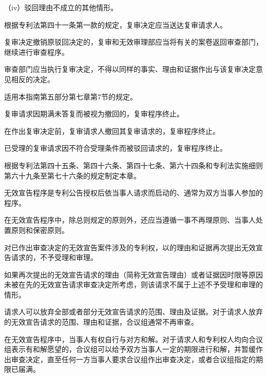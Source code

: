 {\setlength{\parindent}{17.1bp}（iv）驳回理由不成立的其他情形。\par}

根据专利法第四十一条第一款的规定，复审决定应当送达复审请求人。

复审决定撤销原驳回决定的，复审和无效审理部应当将有关的案卷返回审查部门，继续进行审查程序。

审查部门应当执行复审决定，不得以同样的事实、理由和证据作出与该复审决定意见相反的决定。

适用本指南第五部分第七章第7节的规定。

复审请求因期满未答复而被视为撤回的，复审程序终止。

在作出复审决定前，复审请求人撤回其复审请求的，复审程序终止。

已受理的复审请求因不符合受理条件而被驳回请求的，复审程序终止。

根据专利法第四十五条、第四十六条、第四十七条、第六十四条和专利法实施细则第六十九条至第七十六条的规定制定本章。

无效宣告程序是专利公告授权后依当事人请求而启动的、通常为双方当事人参加的程序。

在无效宣告程序中，除总则规定的原则外，还应当遵循一事不再理原则、当事人处置原则和保密原则。

对已作出审查决定的无效宣告案件涉及的专利权，以的理由和证据再次提出无效宣告请求的，不予受理和审理。

如果再次提出的无效宣告请求的理由（简称无效宣告理由）或者证据因时限等原因未被在先的无效宣告请求审查决定所考虑，则该请求不属于上述不予受理和审理的情形。

请求人可以放弃全部或者部分无效宣告请求的范围、理由及证据。对于请求人放弃的无效宣告请求的范围、理由和证据，合议组通常不再审查。

在无效宣告程序中，当事人有权自行与对方和解。对于请求人和专利权人均向合议组表示有和解愿望的，合议组可以给予双方当事人一定的期限进行和解，并暂缓作出审查决定，直至任何一方当事人要求合议组作出审查决定，或者合议组指定的期限已届满。


